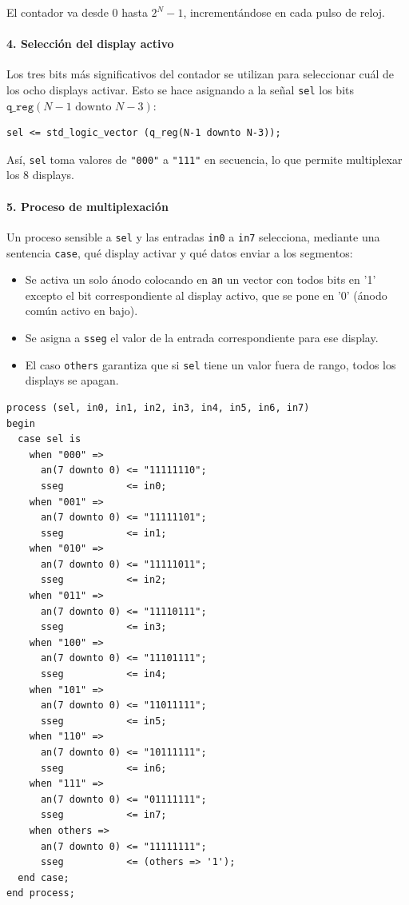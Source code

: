\documentclass[a4paper,12pt]{article}
\begin{document}
El contador va desde 0 hasta \(2^N - 1\), incrementándose en cada pulso de reloj.

\paragraph{4. Selección del display activo}

Los tres bits más significativos del contador se utilizan para seleccionar cuál de los ocho displays activar.  
Esto se hace asignando a la señal \texttt{sel} los bits \(\texttt{q\_reg}(N-1 \text{ downto } N-3)\):

\begin{lstlisting}[basicstyle=\ttfamily\footnotesize]
sel <= std_logic_vector (q_reg(N-1 downto N-3));
\end{lstlisting}

Así, \texttt{sel} toma valores de \texttt{"000"} a \texttt{"111"} en secuencia, lo que permite multiplexar los 8 displays.

\paragraph{5. Proceso de multiplexación}

Un proceso sensible a \texttt{sel} y las entradas \texttt{in0} a \texttt{in7} selecciona, mediante una sentencia \texttt{case}, qué display activar y qué datos enviar a los segmentos:

\begin{itemize}
  \item Se activa un solo ánodo colocando en \texttt{an} un vector con todos bits en '1' excepto el bit correspondiente al display activo, que se pone en '0' (ánodo común activo en bajo).
  \item Se asigna a \texttt{sseg} el valor de la entrada correspondiente para ese display.
  \item El caso \texttt{others} garantiza que si \texttt{sel} tiene un valor fuera de rango, todos los displays se apagan.
\end{itemize}

\begin{lstlisting}[basicstyle=\ttfamily\footnotesize]
process (sel, in0, in1, in2, in3, in4, in5, in6, in7)
begin
  case sel is
    when "000" =>
      an(7 downto 0) <= "11111110";
      sseg           <= in0;
    when "001" =>
      an(7 downto 0) <= "11111101";
      sseg           <= in1;
    when "010" =>
      an(7 downto 0) <= "11111011";
      sseg           <= in2;
    when "011" =>
      an(7 downto 0) <= "11110111";
      sseg           <= in3;
    when "100" =>
      an(7 downto 0) <= "11101111";
      sseg           <= in4;
    when "101" =>
      an(7 downto 0) <= "11011111";
      sseg           <= in5;
    when "110" =>
      an(7 downto 0) <= "10111111";
      sseg           <= in6;
    when "111" =>
      an(7 downto 0) <= "01111111";
      sseg           <= in7;
    when others =>
      an(7 downto 0) <= "11111111";
      sseg           <= (others => '1');
  end case;
end process;
\end{lstlisting}
\end{document}
